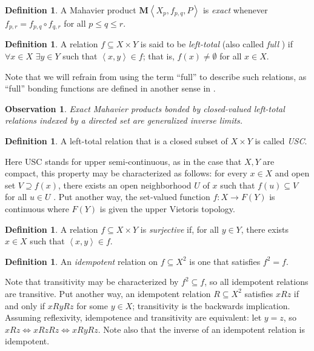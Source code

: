 \documentclass{article}
\newcommand{\term}{\textit}
\newcommand{\tuple}[1]{\left\langle{#1}\right\rangle}
\newcommand{\maProd}[1]{{\mathbf{M}}\tuple{#1}}
\theoremstyle{plain}
\newtheorem{observation}[theorem]{Observation}
\theoremstyle{definition}
\newtheorem{definition}[theorem]{Definition}
\theoremstyle{remark}
\begin{document}
\begin{definition}
A Mahavier product \(\maProd{X_p,f_{p,q},P}\) is \term{exact}
whenever \(f_{p,r}=f_{p,q}\circ f_{q,r}\) for all \(p\leq q\leq r\).
\end{definition}

\begin{definition}
A relation \(f\subseteq X\times Y\) is said to be \term{left-total}
(also called \term{full} \cite{charroe})
if  \(\forall x \in X\) \(\exists y \in Y\) such that 
\(\tuple{x,y}\in f\); that is, \(f(x)\not=\emptyset\)
for all \(x\in X\).
\end{definition}

Note that we will refrain from using the term ``full'' to describe such 
relations, as ``full'' bonding functions are defined in another sense in 
\cite{GreenKen2}.

\begin{observation}
Exact Mahavier products bonded by 
closed-valued left-total relations
indexed by a directed set
are generalized inverse limits.
\end{observation}

\begin{definition}
A left-total relation that is a closed subset of \(X \times Y\) 
is called \term{USC}.
\end{definition}

Here USC stands for upper semi-continuous, as
in the case that \(X,Y\) are compact, this property may be characterized
as follows: for every \(x\in X\) and open set \(V\supseteq f(x)\),
there exists an open neighborhood \(U\) of \(x\) such that
\(f(u)\subseteq V\) for all \(u\in U\) \cite{IngMah1}.
Put another way, the set-valued function \(f:X\to F(Y)\) is continuous
where \(F(Y)\) is given the upper Vietoris topology.

\begin{definition}
A relation \(f\subseteq X\times Y\) is \term{surjective} if, 
for all \(y\in Y\), there exists \(x \in X\) such that 
\(\tuple{x,y}\in f\).
\end{definition}

\begin{definition}
An \term{idempotent} relation on \(f\subseteq X^2\) 
is one that satisfies \(f^2=f\).
\end{definition}

Note that transitivity may be characterized by
\(f^2\subseteq f\), so all idempotent relations are transitive.
Put another way, an idempotent relation \(R\subseteq X^2\)
satisfies \(xRz\) if and only if \(xRyRz\) for some \(y\in X\);
transitivity is the backwards implication.
Assuming reflexivity, idempotence and transitivity are equivalent:
let \(y=z\), so \(xRz\Leftrightarrow xRzRz \Leftrightarrow xRyRz\).
Note also that the inverse of an idempotent relation is idempotent.
\end{document}
